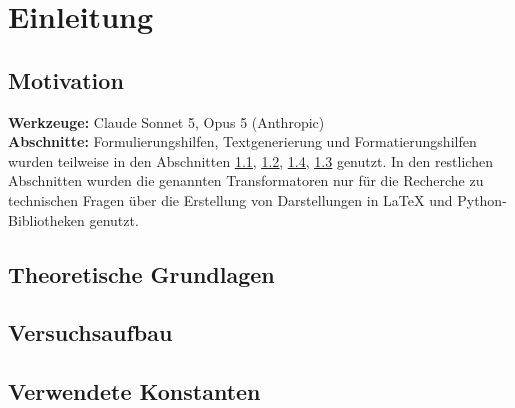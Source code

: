 \documentclass{article}
\let\OrigRef\ref
\renewcommand{\ref}[1]{{\color{linkblue}\uline{\OrigRef{#1}}}}
\begin{document}

\pagestyle{fancy}

\tableofcontents
\clearpage

\section{Einleitung}

\subsection{Motivation}
\label{sec:motivation}

\vspace{1em}
\begin{tcolorbox}[
	colback  = linkblue!3,
	colframe = linkblue!55,
	boxrule  = 0.4pt,
	arc      = 2pt,
	left     = 6pt, right = 6pt, top = 5pt, bottom = 5pt,
	fontupper = \small,
	title    = {\scriptsize\textsf{\textbf{Nutzung von Generativer künstlicher Intelligenz}}},
	coltitle = linkblue!80!black,
	colbacktitle = linkblue!10,
	fonttitle = \normalfont,
]
	\textbf{Werkzeuge:} Claude Sonnet 5, Opus 5 (Anthropic) \\
	\textbf{Abschnitte:} Formulierungshilfen, Textgenerierung und Formatierungshilfen wurden teilweise in 
	den Abschnitten \ref{sec:motivation}, \ref{sec:grundlagen}, \ref{sec:konstanten}, \ref{sec:aufbau} genutzt.
	In den restlichen Abschnitten wurden die genannten Transformatoren nur für die Recherche zu technischen
	Fragen über die Erstellung von Darstellungen in \LaTeX{} und Python-Bibliotheken genutzt.
\end{tcolorbox}


\subsection{Theoretische Grundlagen}
\label{sec:grundlagen}

\subsection{Versuchsaufbau}
\label{sec:aufbau}

\subsection{Verwendete Konstanten}
\label{sec:konstanten}
\end{document}

